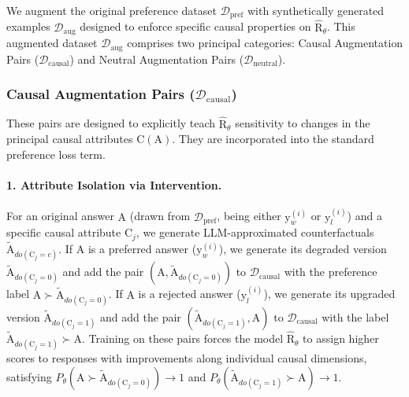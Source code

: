We augment the original preference dataset $\mathcal{D}_{\mathrm{pref}}$ with synthetically generated examples $\mathcal{D}_{\mathrm{aug}}$ designed to enforce specific causal properties on $\hat{\mathrm{R}}_\theta$. This augmented dataset $\mathcal{D}_{\mathrm{aug}}$ comprises two principal categories: Causal Augmentation Pairs ($\mathcal{D}_{\mathrm{causal}}$) and Neutral Augmentation Pairs ($\mathcal{D}_{\mathrm{neutral}}$).

\subsubsection{Causal Augmentation Pairs (\texorpdfstring{$\mathcal{D}_{\mathrm{causal}}$}{D-causal})}
These pairs are designed to explicitly teach $\hat{\mathrm{R}}_\theta$ sensitivity to changes in the principal causal attributes $\mathrm{C}(\mathrm{A})$. They are incorporated into the standard preference loss term.

\paragraph{1. Attribute Isolation via Intervention.}
For an original answer $\mathrm{A}$ (drawn from $\mathcal{D}_{\mathrm{pref}}$, being either $\mathrm{y}_w^{(i)}$ or $\mathrm{y}_l^{(i)}$) and a specific causal attribute $\mathrm{C}_j$, we generate LLM-approximated counterfactuals $\tilde{\mathrm{A}}_{do(\mathrm{C}_j=c)}$. If $\mathrm{A}$ is a preferred answer ($\mathrm{y}_w^{(i)}$), we generate its degraded version $\tilde{\mathrm{A}}_{do(\mathrm{C}_j=0)}$ and add the pair $(\mathrm{A}, \tilde{\mathrm{A}}_{do(\mathrm{C}_j=0)})$ to $\mathcal{D}_{\mathrm{causal}}$ with the preference label $\mathrm{A} \succ \tilde{\mathrm{A}}_{do(\mathrm{C}_j=0)}$. If $\mathrm{A}$ is a rejected answer ($\mathrm{y}_l^{(i)}$), we generate its upgraded version $\tilde{\mathrm{A}}_{do(\mathrm{C}_j=1)}$ and add the pair $(\tilde{\mathrm{A}}_{do(\mathrm{C}_j=1)}, \mathrm{A})$ to $\mathcal{D}_{\mathrm{causal}}$ with the label $\tilde{\mathrm{A}}_{do(\mathrm{C}_j=1)} \succ \mathrm{A}$. Training on these pairs forces the model $\hat{\mathrm{R}}_\theta$ to assign higher scores to responses with improvements along individual causal dimensions, satisfying $P_\theta(\mathrm{A} \succ \tilde{\mathrm{A}}_{do(\mathrm{C}_j=0)}) \to 1$ and $P_\theta(\tilde{\mathrm{A}}_{do(\mathrm{C}_j=1)} \succ \mathrm{A}) \to 1$.

